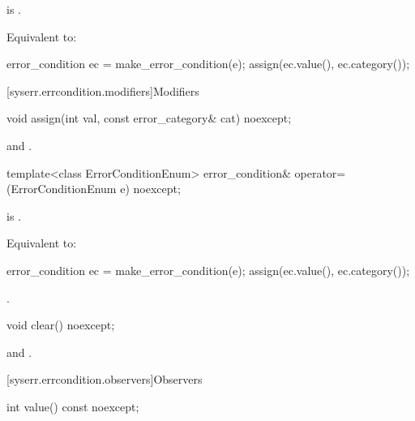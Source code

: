 \begin{itemdescr}
\pnum
\constraints
{} is .

\pnum
\effects
Equivalent to:
\begin{codeblock}
error_condition ec = make_error_condition(e);
assign(ec.value(), ec.category());
\end{codeblock}
\end{itemdescr}


[syserr.errcondition.modifiers]{Modifiers}

%
\begin{itemdecl}
void assign(int val, const error_category& cat) noexcept;
\end{itemdecl}

\begin{itemdescr}
\pnum
\ensures
{} and .
\end{itemdescr}

%
\begin{itemdecl}
template<class ErrorConditionEnum>
  error_condition& operator=(ErrorConditionEnum e) noexcept;
\end{itemdecl}

\begin{itemdescr}
\pnum
\constraints
{} is .

\pnum
\effects
Equivalent to:
\begin{codeblock}
error_condition ec = make_error_condition(e);
assign(ec.value(), ec.category());
\end{codeblock}

\pnum
\returns
{}.
\end{itemdescr}

%
\begin{itemdecl}
void clear() noexcept;
\end{itemdecl}

\begin{itemdescr}
\pnum
\ensures
{} and .
\end{itemdescr}

[syserr.errcondition.observers]{Observers}

%
\begin{itemdecl}
int value() const noexcept;
\end{itemdecl}

